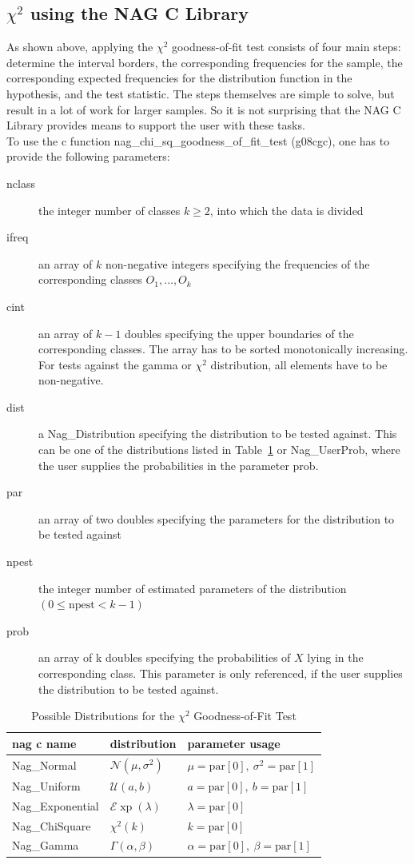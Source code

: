 \documentclass{article}
\newcommand{\reftbl}[1]{Table~\ref{#1}}
\begin{document}
\subsection{$\chi^2$ using the NAG C Library}
As shown above, applying the $\chi^2$ goodness-of-fit test consists of four main steps: determine the interval borders, the corresponding frequencies for the sample, the corresponding expected frequencies for the distribution function in the hypothesis, and the test statistic.
The steps themselves are simple to solve, but result in a lot of work for larger samples.
So it is not surprising that the NAG C Library provides means to support the user with these tasks.
\\
To use the c function nag\_chi\_sq\_goodness\_of\_fit\_test (g08cgc), one has to provide the following parameters:
\begin{description}
	\item[nclass] the integer number of classes $k\geq 2$, into which the data is divided
	\item[ifreq] an array of $k$ non-negative integers specifying the frequencies of the corresponding classes $O_{1}, \ldots, O_{k}$
	\item[cint] an array of $k-1$ doubles specifying the upper boundaries of the corresponding classes.
		The array has to be sorted monotonically increasing.
		For tests against the gamma or $\chi^2$ distribution, all elements have to be non-negative.
	\item[dist] a Nag\_Distribution specifying the distribution to be tested against. This can be one of the distributions listed in \reftbl{tbl:chisq_distributions} or Nag\_UserProb, where the user supplies the probabilities in the parameter prob.
	\item[par] an array of two doubles specifying the parameters for the distribution to be tested against
	\item[npest] the integer number of estimated parameters of the distribution $(0\leq\text{npest}<k-1)$
	\item[prob] an array of k doubles specifying the probabilities of $X$ lying in the corresponding class.
		This parameter is only referenced, if the user supplies the distribution to be tested against.
\end{description}
\begin{table}[htbp]
\center
\caption{Possible Distributions for the $\chi^2$ Goodness-of-Fit Test}
\label{tbl:chisq_distributions}
\begin{tabular}{lll}
nag c name & distribution & parameter usage \\
\hline
Nag\_Normal & $\mathcal{N}(\mu,\sigma^2)$ & $\mu=\text{par}[0],~\sigma^2=\text{par}[1]$  \\
Nag\_Uniform & $\mathcal{U}(a,b)$ & $a=\text{par}[0],~b=\text{par}[1]$ \\
Nag\_Exponential & $\mathcal{E}\operatorname{xp}(\lambda)$ & $\lambda=\text{par}[0]$ \\
Nag\_ChiSquare & $\chi^2(k)$ & $k=\text{par}[0]$ \\
Nag\_Gamma & $\Gamma(\alpha,\beta)$ & $\alpha=\text{par}[0],~\beta=\text{par}[1]$
\end{tabular}
\end{table}
\end{document}
